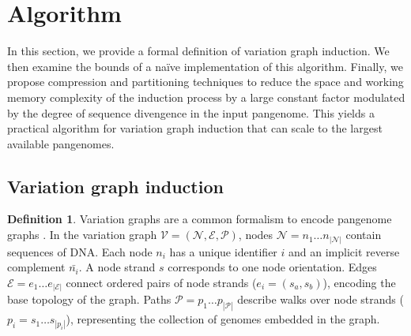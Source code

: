 \documentclass{bioinfo}
\theoremstyle{definition}
\newtheorem{definition}{Definition}[section]
\begin{document}




\section{Algorithm}
\label{sec:algorithm}

In this section, we provide a formal definition of variation graph induction.
We then examine the bounds of a na\"{i}ve implementation of this algorithm.
Finally, we propose compression and partitioning techniques to reduce the space and working memory complexity of the induction process by a large constant factor modulated by the degree of sequence divengence in the input pangenome.
This yields a practical algorithm for variation graph induction that can scale to the largest available pangenomes.

\subsection{Variation graph induction}

\begin{definition}
\label{def:vg}
Variation graphs are a common formalism to encode pangenome graphs \citep{Garrison_2019_thesis}.
In the variation graph $\mathcal{V} = (\mathcal{N}, \mathcal{E}, \mathcal{P})$, nodes $\mathcal{N} = n_1\ldots n_{|\mathcal{N}|}$ contain sequences of DNA.
Each node $n_i$ has a unique identifier $i$ and an implicit reverse complement $\bar{n_i}$.
A node strand $s$ corresponds to one node orientation.
Edges $\mathcal{E} = e_1\ldots e_{|\mathcal{E}|}$ connect ordered pairs of node strands ($e_i = ( s_a, s_b )$), encoding the base topology of the graph.
Paths $\mathcal{P} = p_1\ldots p_{|\mathcal{P}|}$ describe walks over node strands ($p_i = s_1 \ldots s_{|p_i|}$), representing the collection of genomes embedded in the graph.
\end{definition}
\end{document}
